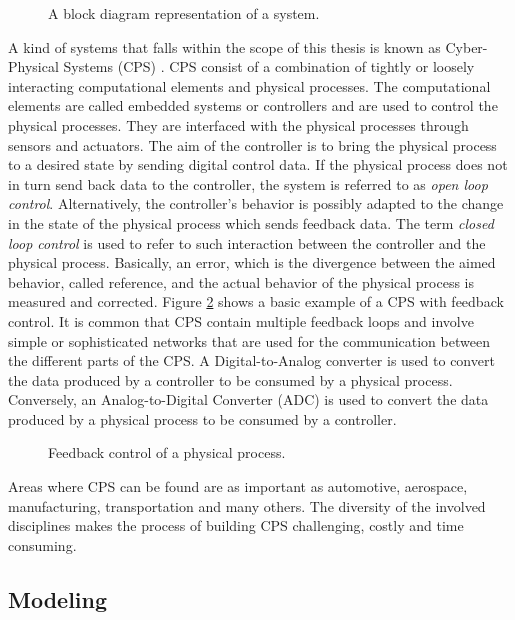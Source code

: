 \begin{figure}[phbt]
\centering

\caption{A block diagram representation of a system.}
\label{fig:system}
\end{figure}

A kind of systems that falls within the scope of this thesis is known as Cyber-Physical Systems (CPS) \cite{lee:2016}. CPS consist of a combination of tightly or loosely interacting computational elements and physical processes. The computational elements are called embedded systems or controllers and are used to control the physical processes. They are interfaced with the physical processes through sensors and actuators. The aim of the controller is to bring the physical process to a desired state by sending digital control data. If the physical process does not in turn send back data to the controller, the system is referred to as \textit{open loop control}. Alternatively, the controller's behavior is possibly adapted to the change in the state of the physical process which sends feedback data. The term \textit{closed loop control} is used to refer to such interaction between the controller and the physical process. Basically, an error, which is the divergence between the aimed behavior, called reference, and the actual behavior of the physical process is measured and corrected. Figure \ref{fig:feedb} shows a basic example of a CPS with feedback control. It is common that CPS contain multiple feedback loops and involve simple or sophisticated networks that are used for the communication between the different parts of the CPS. A Digital-to-Analog converter is used to convert the data produced by a controller to be consumed by a physical process. Conversely, an Analog-to-Digital Converter (ADC) is used to convert the data produced by a physical process to be consumed by a controller. 

\begin{figure}[phbt]
\centering

\caption{Feedback control of a physical process.}
\label{fig:feedb}
\end{figure}  

Areas where CPS can be found are as important as automotive, aerospace, manufacturing, transportation and many others. The diversity of the involved disciplines makes the process of building CPS challenging, costly and time consuming.

\subsection{Modeling}

